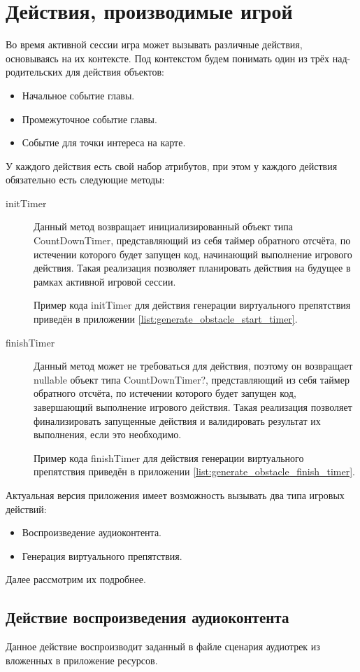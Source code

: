 \section{Действия, производимые игрой}
\label{sec:actions}
Во время активной сессии игра может вызывать различные действия, основываясь на их контексте. Под контекстом будем понимать один из трёх над-родительских для действия объектов:
\begin{itemize}
	\item Начальное событие главы.
	\item Промежуточное событие главы.
	\item Событие для точки интереса на карте.
\end{itemize}
\smallskip

У каждого действия есть свой набор атрибутов, при этом у каждого действия обязательно есть следующие методы:
\begin{description}
	\item[initTimer] Данный метод возвращает инициализированный объект типа CountDownTimer, представляющий из себя таймер обратного отсчёта, по истечении которого будет запущен код, начинающий выполнение игрового действия. Такая реализация позволяет планировать действия на будущее в рамках активной игровой сессии.
	
	Пример кода initTimer для действия генерации виртуального препятствия приведён в приложении \ref{list:generate_obstacle_start_timer}.
	\item[finishTimer] Данный метод может не требоваться для действия, поэтому он возвращает  nullable объект типа CountDownTimer?, представляющий из себя таймер обратного отсчёта, по истечении которого будет запущен код, завершающий выполнение игрового действия. Такая реализация позволяет финализировать запущенные действия и валидировать результат их выполнения, если это необходимо.
	
	Пример кода finishTimer для действия генерации виртуального препятствия приведён в приложении \ref{list:generate_obstacle_finish_timer}.
\end{description}
\smallskip
Актуальная версия приложения имеет возможность вызывать два типа игровых действий:
\begin{itemize}
	\item Воспроизведение аудиоконтента.
	\item Генерация виртуального препятствия.
\end{itemize}
\smallskip
Далее рассмотрим их подробнее.

\subsection*{Действие воспроизведения аудиоконтента}
Данное действие воспроизводит заданный в файле сценария аудиотрек из вложенных в приложение ресурсов.

